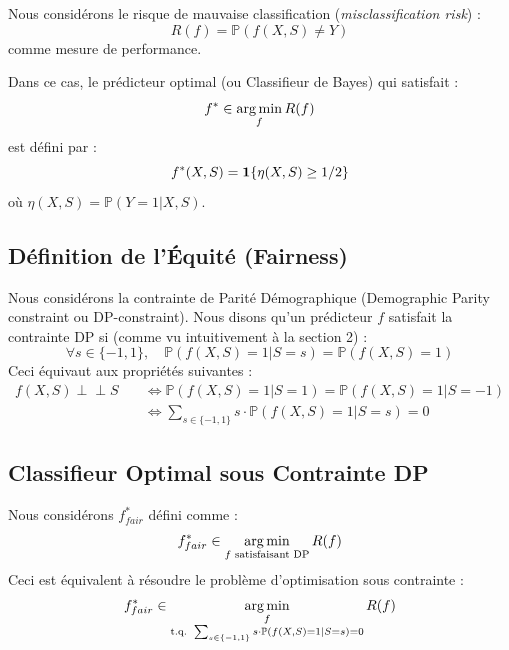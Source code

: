 Nous considérons le risque de mauvaise classification (\textit{misclassification risk}) :
\begin{equation}
    R(f) = \mathbb{P}(f(X,S) \neq Y)
\end{equation}
comme mesure de performance.

Dans ce cas, le prédicteur optimal (ou Classifieur de Bayes) qui satisfait :
\begin{equation}
    f^* \in \operatorname*{arg\,min}_{f} R(f)
\end{equation}
est défini par :
\begin{equation}
    f^*(X,S) = \mathbf{1}\{\eta(X,S) \ge 1/2\}
\end{equation}
où $\eta(X,S) = \mathbb{P}(Y=1 | X,S)$.

\subsection{Définition de l'Équité (Fairness)}

Nous considérons la contrainte de Parité Démographique (Demographic Parity constraint ou DP-constraint).
Nous disons qu'un prédicteur $f$ satisfait la contrainte DP si (comme vu intuitivement à la section 2) :
\begin{equation}
    \forall s \in \{-1, 1\}, \quad \mathbb{P}(f(X,S)=1 | S=s) = \mathbb{P}(f(X,S)=1)
\end{equation}
Ceci équivaut aux propriétés suivantes :
\begin{align*}
    f(X,S) \perp \!\!\! \perp S \quad &\iff \mathbb{P}(f(X,S)=1 | S=1) = \mathbb{P}(f(X,S)=1 | S=-1) \\
    &\iff \sum_{s \in \{-1, 1\}} s \cdot \mathbb{P}(f(X,S)=1 | S=s) = 0
\end{align*}

\subsection{Classifieur Optimal sous Contrainte DP}

Nous considérons $f^*_{fair}$ défini comme :
\begin{equation}
    f^*_{fair} \in \operatorname*{arg\,min}_{f \text{ satisfaisant DP}} R(f)
\end{equation}
Ceci est équivalent à résoudre le problème d'optimisation sous contrainte :
\begin{equation}
    f^*_{fair} \in \operatorname*{arg\,min}_{\substack{f \\ \text{t.q. } \sum_{s \in \{-1, 1\}} s \cdot \mathbb{P}(f(X,S)=1 | S=s) = 0}} R(f)
\end{equation}

